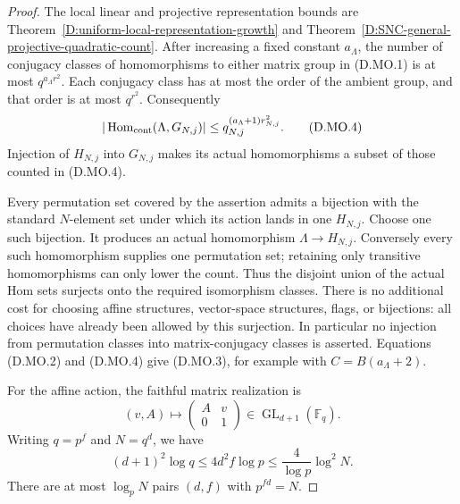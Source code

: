 \begin{proof}
The local linear and projective representation bounds are
Theorem~\ref{D:uniform-local-representation-growth} and
Theorem~\ref{D:SNC-general-projective-quadratic-count}.
After increasing a fixed constant $a_\Lambda$, the number of
conjugacy classes of homomorphisms to either matrix group in
(D.MO.1) is at most $q^{a_\Lambda r^2}$. Each conjugacy class has
at most the order of the ambient group, and that order is at
most $q^{r^2}$. Consequently
\[
       |\operatorname{Hom}_{\rm cont}(\Lambda,G_{N,j})|
                     \le q_{N,j}^{(a_\Lambda+1)r_{N,j}^{2}}.
                                                        \tag{D.MO.4}
\]
Injection of $H_{N,j}$ into $G_{N,j}$ makes its actual
homomorphisms a subset of those counted in (D.MO.4).

Every permutation set covered by the assertion admits a
bijection with the standard $N$-element set under which its
action lands in one $H_{N,j}$. Choose one such bijection. It
produces an actual homomorphism $\Lambda\to H_{N,j}$.
Conversely every such homomorphism supplies one permutation
set; retaining only transitive homomorphisms can only lower
the count. Thus the disjoint union of the actual Hom sets
surjects onto the required isomorphism classes. There is no
additional cost for choosing affine structures, vector-space
structures, flags, or bijections: all choices have already
been allowed by this surjection. In particular no injection
from permutation classes into matrix-conjugacy classes is
asserted. Equations (D.MO.2) and (D.MO.4) give (D.MO.3), for
example with $C=B(a_\Lambda+2)$.

For the affine action, the faithful matrix realization is
\[
 (v,A)\longmapsto
 \begin{pmatrix}A&v\\0&1\end{pmatrix}
                  \in\operatorname{GL}_{d+1}(\mathbb F_q).
                                                        \tag{D.MO.5}
\]
Writing $q=p^f$ and $N=q^d$, we have
\[
     (d+1)^2\log q\le4d^2f\log p
                    \le\frac{4}{\log p}\log^2N.          \tag{D.MO.6}
\]
There are at most $\log_pN$ pairs $(d,f)$ with $p^{fd}=N$.


\end{proof}
